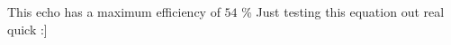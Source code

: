 





This echo has a maximum efficiency of $54$
\%
Just testing this equation out real quick :] 






